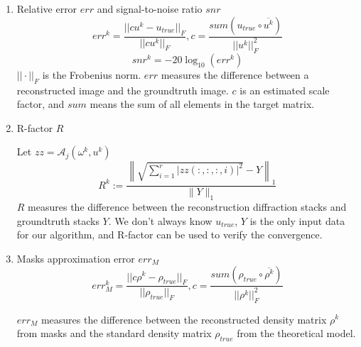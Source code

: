 \documentclass{article}
\numberwithin{equation}{section}
\begin{document}
\begin{enumerate}[leftmargin=*]
\item Relative error $err$ and signal-to-noise ratio $snr$
$$
err^k = \dfrac{|| c u^k - u_{true} ||_F  }{||c u^k||_F}, c = \frac{sum(u_{true} \circ \overline{u^k}) }{||u^k||_F^2}
$$
$$
snr^k = -20\log_{10}(err^k)
$$
$|| \cdot ||_F$ is the Frobenius norm. $err$ measures the difference between a reconstructed image and the groundtruth image. $c$ is an estimated scale factor, and $sum$ means the sum of all elements in the target matrix. 

\item R-factor $R$

Let $zz = \mathcal{A}_{j}\left(\omega^{k}, u^{k}\right)$
$$
R^{k}:=\frac{\left\| \sqrt{\sum_{i=1}^{r} |zz(:,:,:,i)|^2}-Y\right\|_{1}}{\|Y\|_{1}}
$$
$R$ measures the difference between the reconstruction diffraction stacks and groundtruth stacks $Y$. We don't always know $u_{true}$, $Y$ is the only input data for our algorithm, and R-factor can be used to verify the
convergence.

\item Masks approximation error $err_M$
$$
err_M^k = \frac{||c\rho^k - \rho_{true}||_F}{||\rho_{true}||_F},
c = \frac{sum(\rho_{true} \circ \overline{\rho^k}) }{||\rho^k||_F^2}
$$

$err_M$ measures the difference between the reconstructed density matrix $\rho^k$ from masks and the standard density matrix $\rho_{true}$ from the theoretical model. 

\end{enumerate} 
\end{document}
